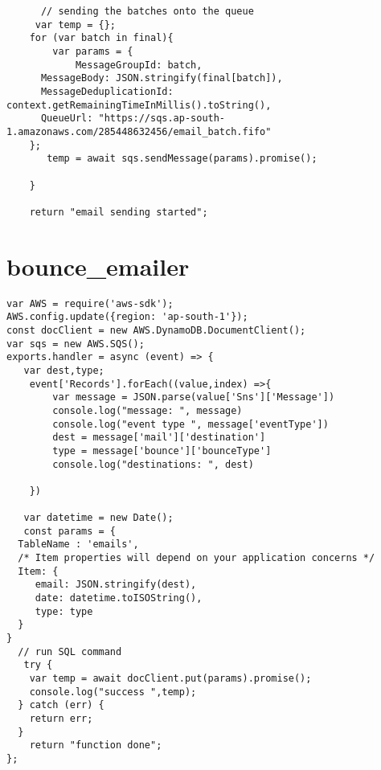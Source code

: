 \begin{lstlisting}
      // sending the batches onto the queue
     var temp = {};
    for (var batch in final){
        var params = {
            MessageGroupId: batch,
      MessageBody: JSON.stringify(final[batch]),
      MessageDeduplicationId: context.getRemainingTimeInMillis().toString(),
      QueueUrl: "https://sqs.ap-south-1.amazonaws.com/285448632456/email_batch.fifo"
    };
       temp = await sqs.sendMessage(params).promise();

    }
    
    return "email sending started";

\end{lstlisting}

\section*{bounce\_emailer}
\begin{lstlisting}
var AWS = require('aws-sdk');
AWS.config.update({region: 'ap-south-1'});
const docClient = new AWS.DynamoDB.DocumentClient();
var sqs = new AWS.SQS();
exports.handler = async (event) => {
   var dest,type; 
    event['Records'].forEach((value,index) =>{
        var message = JSON.parse(value['Sns']['Message'])
        console.log("message: ", message)
        console.log("event type ", message['eventType'])
        dest = message['mail']['destination']
        type = message['bounce']['bounceType']
        console.log("destinations: ", dest)
        
    })
   
   var datetime = new Date();
   const params = {
  TableName : 'emails',
  /* Item properties will depend on your application concerns */
  Item: {
     email: JSON.stringify(dest),
     date: datetime.toISOString(),
     type: type
  }
}
  // run SQL command
   try {
    var temp = await docClient.put(params).promise();
    console.log("success ",temp);
  } catch (err) {
    return err;
  }
    return "function done";
};

\end{lstlisting}

